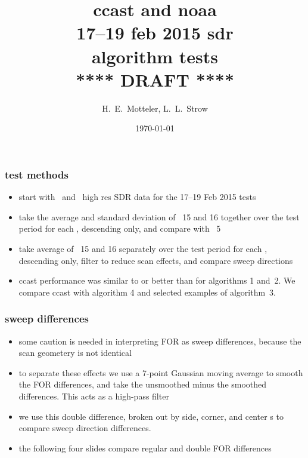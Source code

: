 \documentclass[11pt]{beamer}
\title{ccast and noaa \\
  17--19 feb 2015 sdr \\
  algorithm tests \\
  {****} DRAFT {****}}
\author{H.~E.~Motteler, L.~L.~Strow}
\institute{
  UMBC Atmospheric Spectroscopy Lab \\
  Joint Center for Earth Systems Technology \\
}
\date{\today}
\begin{document}
\begin{frame}[plain]
\titlepage
\end{frame}
\begin{frame}
\frametitle{test methods}

\begin{itemize}

  \item start with \ccast\ and \noaa\ high res SDR data for the
    17--19 Feb 2015 tests

  \item take the average and standard deviation of \for\ 15 and 16
    together over the test period for each \fov, descending only,
    and compare with \fov\ 5

  \item take average of \for\ 15 and 16 separately over the test
    period for each \fov, descending only, filter to reduce scan
    effects, and compare sweep directions
    
  \item ccast performance was similar to or better than {\noaa} for
    algorithms 1 and~2.  We compare ccast with {\noaa} algorithm 4
    and selected examples of algorithm~3.
    
\end{itemize}

\end{frame}
\begin{frame}
\frametitle{sweep differences}

\begin{itemize}

  \item some caution is needed in interpreting FOR as sweep
    differences, because the scan geometery is not identical

  \item to separate these effects we use a 7-point Gaussian moving
    average to smooth the FOR differences, and take the unsmoothed
    minus the smoothed differences.  This acts as a high-pass filter

  \item we use this double difference, broken out by side, corner,
    and center {\fov}s to compare sweep direction differences.

  \item the following four slides compare regular and double FOR
    differences

\end{itemize}

\end{frame}
\end{document}
